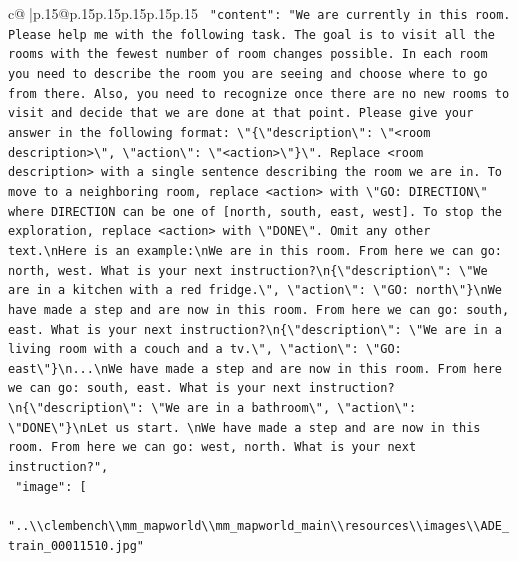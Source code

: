 \documentclass{article}
\begin{document}
{\begin{supertabular}{c@{$\;$}|p{.15\linewidth}@{}p{.15\linewidth}p{.15\linewidth}p{.15\linewidth}p{.15\linewidth}p{.15\linewidth}}
{{{\texttt{    "content": "We are currently in this room. Please help me with the following task. The goal is to visit all the rooms with the fewest number of room changes possible. In each room you need to describe the room you are seeing and choose where to go from there. Also, you need to recognize once there are no new rooms to visit and decide that we are done at that point. Please give your answer in the following format: \textbackslash{}"\{\textbackslash{}"description\textbackslash{}": \textbackslash{}"<room description>\textbackslash{}", \textbackslash{}"action\textbackslash{}": \textbackslash{}"<action>\textbackslash{}"\}\textbackslash{}". Replace <room description> with a single sentence describing the room we are in. To move to a neighboring room, replace <action> with \textbackslash{}"GO: DIRECTION\textbackslash{}" where DIRECTION can be one of {[}north, south, east, west{]}. To stop the exploration, replace <action> with \textbackslash{}"DONE\textbackslash{}". Omit any other text.\textbackslash{}nHere is an example:\textbackslash{}nWe are in this room. From here we can go: north, west. What is your next instruction?\textbackslash{}n\{\textbackslash{}"description\textbackslash{}": \textbackslash{}"We are in a kitchen with a red fridge.\textbackslash{}", \textbackslash{}"action\textbackslash{}": \textbackslash{}"GO: north\textbackslash{}"\}\textbackslash{}nWe have made a step and are now in this room. From here we can go: south, east. What is your next instruction?\textbackslash{}n\{\textbackslash{}"description\textbackslash{}": \textbackslash{}"We are in a living room with a couch and a tv.\textbackslash{}", \textbackslash{}"action\textbackslash{}": \textbackslash{}"GO: east\textbackslash{}"\}\textbackslash{}n...\textbackslash{}nWe have made a step and are now in this room. From here we can go: south, east. What is your next instruction?\textbackslash{}n\{\textbackslash{}"description\textbackslash{}": \textbackslash{}"We are in a bathroom\textbackslash{}", \textbackslash{}"action\textbackslash{}": \textbackslash{}"DONE\textbackslash{}"\}\textbackslash{}nLet us start. \textbackslash{}nWe have made a step and are now in this room. From here we can go: west, north. What is your next instruction?",} \\
\texttt{    "image": {[}} \\
\texttt{      "..\textbackslash{}\textbackslash{}clembench\textbackslash{}\textbackslash{}mm\_mapworld\textbackslash{}\textbackslash{}mm\_mapworld\_main\textbackslash{}\textbackslash{}resources\textbackslash{}\textbackslash{}images\textbackslash{}\textbackslash{}ADE\_train\_00011510.jpg"} \\
}}}
\end{supertabular}}
\end{document}
